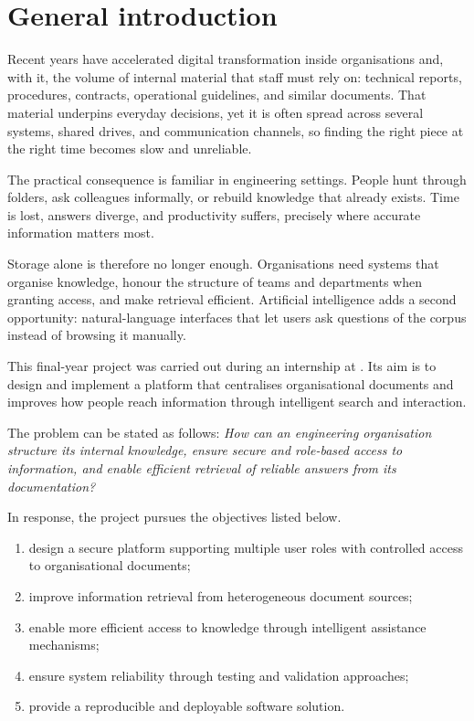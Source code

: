 \chapter*{General introduction}

Recent years have accelerated digital transformation inside organisations and,
with it, the volume of internal material that staff must rely on: technical
reports, procedures, contracts, operational guidelines, and similar documents.
That material underpins everyday decisions, yet it is often spread across several
systems, shared drives, and communication channels, so finding the right piece at
the right time becomes slow and unreliable.

The practical consequence is familiar in engineering settings. People hunt through
folders, ask colleagues informally, or rebuild knowledge that already exists.
Time is lost, answers diverge, and productivity suffers, precisely where accurate
information matters most.

Storage alone is therefore no longer enough. Organisations need systems that
organise knowledge, honour the structure of teams and departments when granting
access, and make retrieval efficient. Artificial intelligence adds a second
opportunity: natural-language interfaces that let users ask questions of the
corpus instead of browsing it manually.

This final-year project was carried out during an internship at \CompanyName{}.
Its aim is to design and implement a platform that centralises organisational
documents and improves how people reach information through intelligent search
and interaction.

The problem can be stated as follows:
\emph{How can an engineering organisation structure its internal knowledge, ensure
secure and role-based access to information, and enable efficient retrieval of
reliable answers from its documentation?}

In response, the project pursues the objectives listed below.
\begin{enumerate}[leftmargin=*,itemsep=0.2em]
  \item design a secure platform supporting multiple user roles with controlled access to organisational documents;
  \item improve information retrieval from heterogeneous document sources;
  \item enable more efficient access to knowledge through intelligent assistance mechanisms;
  \item ensure system reliability through testing and validation approaches;
  \item provide a reproducible and deployable software solution.
\end{enumerate}

